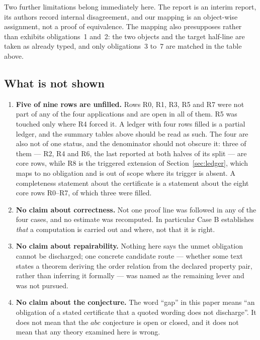 \documentclass[11pt,a4paper]{article}
\theoremstyle{definition}
\begin{document}
Two further limitations belong immediately here. The report is an interim report,
its authors record internal disagreement, and our mapping is an object-wise
assignment, not a proof of equivalence. The mapping also presupposes rather than
exhibits obligations~1 and~2: the two objects and the target half-line are taken as
already typed, and only obligations~3 to~7 are matched in the table above.

\subsection{What is not shown}

\begin{enumerate}
\item \textbf{Five of nine rows are unfilled.} Rows R0, R1, R3, R5 and R7 were not
  part of any of the four applications and are open in all of them. R5 was touched
  only where R4 forced it. A ledger with four rows filled is a partial ledger, and
  the summary tables above should be read as such. The four are also not of one
  status, and the denominator should not obscure it: three of them --- R2, R4 and
  R6, the last reported at both halves of its split --- are core rows, while R8 is
  the triggered extension of Section~\ref{sec:ledger}, which maps to no obligation
  and is out of scope where its trigger is absent. A completeness statement about
  the certificate is a statement about the eight core rows R0--R7, of which three
  were filled.
\item \textbf{No claim about correctness.} Not one proof line was followed in any
  of the four cases, and no estimate was recomputed. In particular Case B
  establishes \emph{that} a computation is carried out and where, not that it is
  right.
\item \textbf{No claim about repairability.} Nothing here says the unmet
  obligation cannot be discharged; one concrete candidate route --- whether some
  text states a theorem deriving the order relation from the declared property
  pair, rather than inferring it formally --- was named as the remaining lever and
  was not pursued.
\item \textbf{No claim about the conjecture.} The word ``gap'' in this paper means
  ``an obligation of a stated certificate that a quoted wording does not
  discharge''. It does not mean that the $abc$ conjecture is open or closed, and
  it does not mean that any theory examined here is wrong.
\end{enumerate}
\end{document}
